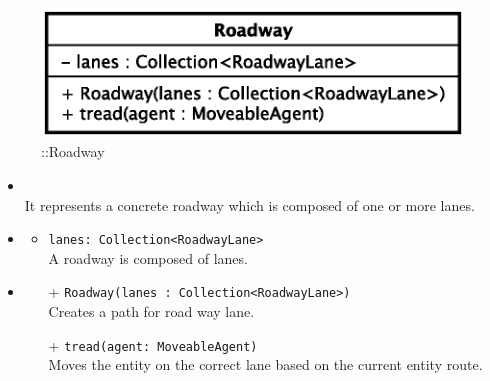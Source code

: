 \begin{figure}[h]
\centering
\includegraphics[scale=0.6,keepaspectratio]{images/solution/app/backend/roadway.eps}
\caption{\pReactiveComponent::Roadway}
\label{fig:sd-app-roadway}
\end{figure}
\FloatBarrier
\begin{itemize}
  \item \textbf{\descr} \\
    It represents a concrete roadway which is composed of one or more lanes.
  \item \textbf{\attrs}
  \begin{itemize}
    \item \texttt{lanes: Collection<RoadwayLane>} \\
A roadway is composed of lanes.
  \end{itemize}
  \item \textbf{\ops}
  \begin{itemize}
  \item[+] \texttt{Roadway(lanes : Collection<RoadwayLane>)} \\
    Creates a path for road way lane.
    \item[+] \texttt{tread(agent: MoveableAgent)} \\
Moves the entity on the correct lane based on the current entity route. 
  \end{itemize}
\end{itemize}
